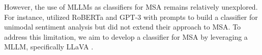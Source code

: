 However, the use of MLLMs as classifiers for MSA remains relatively unexplored. For instance, \citet{sun-etal-2023-text} utilized RoBERTa and GPT-3 with prompts to build a classifier for unimodal sentiment analysis but did not extend their approach to MSA. To address this limitation, we aim to develop a classifier for MSA by leveraging a MLLM, specifically LLaVA \citep{liu-etal-2023-improved,liu-etal-2023-visual-arxiv}.